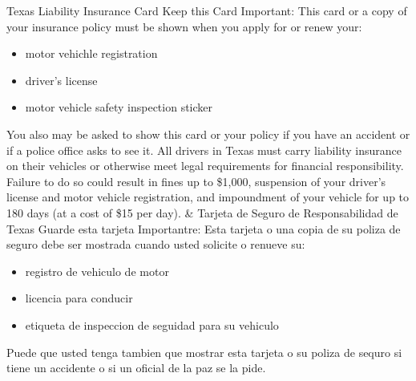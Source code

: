 \documentclass{article}
\begin{document}
\begin{tabularx}
\hline
Texas Liability \newline
Insurance Card \newline
Keep this Card \newline
Important: This card or a copy of your insurance policy \newline
must be shown when you apply for or renew your:
\begin{itemize}
  \item motor vehichle registration
  \item driver’s license
  \item motor vehicle safety inspection sticker
\end{itemize}
You also may be asked to show this card or your policy if \newline
you have an accident or if a police office asks to see it. \newline
All drivers in Texas must carry liability insurance on their \newline
vehicles or otherwise meet legal requirements for financial \newline
responsibility. Failure to do so could result in fines up to \newline
\$1,000, suspension of your driver’s license and motor \newline
vehicle registration, and impoundment of your vehicle for \newline
up to 180 days (at a cost of \$15 per day). &
Tarjeta de Seguro de \newline
Responsabilidad de Texas \newline
Guarde esta tarjeta \newline
Importantre: Esta tarjeta o una copia de su poliza de \newline
seguro debe ser mostrada cuando usted solicite o renueve \newline
su:
\begin{itemize}
  \item registro de vehiculo de motor
  \item licencia para conducir
  \item etiqueta de inspeccion de seguidad para su \newline
        vehiculo
\end{itemize}
Puede que usted tenga tambien que mostrar esta tarjeta o \newline
su poliza de sequro si tiene un accidente o si un oficial de \newline
la paz se la pide. \newline

\end{tabularx}
\end{document}
